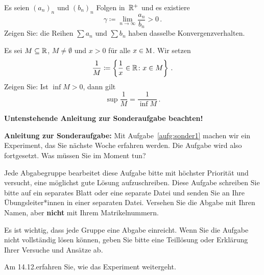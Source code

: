 \bigskip


\begin{aufg}[6 Punkte]
Es seien $(a_n)_n$ und $(b_n)_n$ Folgen in~$\mathbb{R}^+$ und es existiere 
\[
 \gamma\coloneqq \lim_{n\to\infty} \frac{a_n}{b_n} > 0\,.
\]
Zeigen Sie: die Reihen $\sum a_n$ und $\sum b_n$ haben dasselbe Konvergenzverhalten.
\end{aufg}


\bigskip

\begin{lsg}  
\end{lsg}


\bigskip

\begin{aufg}\label{aufg:sonder1}
Es sei $M\subseteq\mathbb{R}$, $M\not=\emptyset$ und $x>0$ f\"ur alle $x\in\operatorname{M}$. Wir setzen
\[
 \frac1M \coloneqq \left\{ \frac1x \in \mathbb{R} \colon x\in M \right\}\,.
\]
Zeigen Sie: Ist $\inf M >0$, dann gilt 
\[
 \sup \frac1M = \frac{1}{\inf M}\,.
\]
\end{aufg}

\bigskip

\begin{lsg}
\end{lsg}

\bigskip 

\begin{center}
 {\large\textbf{Untenstehende Anleitung zur Sonderaufgabe beachten!}}
\end{center}

\bigskip


\noindent
\textbf{Anleitung zur Sonderaufgabe:} Mit Aufgabe~\ref{aufg:sonder1} machen wir ein Experiment, das Sie n\"achste Woche erfahren werden. Die Aufgabe wird also fortgesetzt. Was m\"ussen Sie im Moment tun?

Jede Abgabegruppe bearbeitet diese Aufgabe bitte mit h\"ochster Priorit\"at und versucht, eine m\"oglichst gute L\"osung aufzuschreiben. Diese Aufgabe schreiben Sie bitte auf ein separates Blatt oder eine separate Datei und senden Sie an Ihre \"Ubungsleiter*innen in einer separaten Datei. Versehen Sie die Abgabe mit Ihren Namen, aber \textbf{nicht} mit Ihrem Matrikelnummern. 

Es ist wichtig, dass jede Gruppe eine Abgabe einreicht. Wenn Sie die Aufgabe nicht vollst\"andig l\"osen k\"onnen, geben Sie bitte eine Teill\"osung oder Erkl\"arung Ihrer Versuche und Ans\"atze ab.

Am 14.12.\@ erfahren Sie, wie das Experiment weitergeht.

